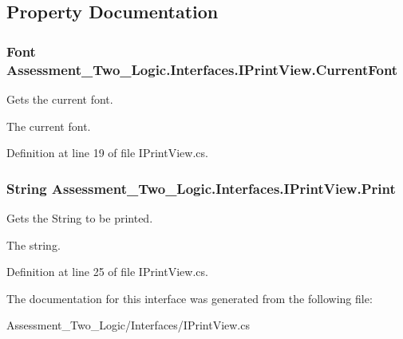 \subsection{Property Documentation}
\hypertarget{interface_assessment___two___logic_1_1_interfaces_1_1_i_print_view_a9368f6ee671be1c540a3d9240f03aed4}{
\subsubsection[{CurrentFont}]{\setlength{\rightskip}{0pt plus 5cm}Font Assessment\_\-Two\_\-Logic.Interfaces.IPrintView.CurrentFont}}
\label{interface_assessment___two___logic_1_1_interfaces_1_1_i_print_view_a9368f6ee671be1c540a3d9240f03aed4}


Gets the current font. 

The current font.

Definition at line 19 of file IPrintView.cs.

\hypertarget{interface_assessment___two___logic_1_1_interfaces_1_1_i_print_view_aae77c0c48f1acccf4fe91b8fd2cd265f}{
\subsubsection[{Print}]{\setlength{\rightskip}{0pt plus 5cm}String Assessment\_\-Two\_\-Logic.Interfaces.IPrintView.Print}}
\label{interface_assessment___two___logic_1_1_interfaces_1_1_i_print_view_aae77c0c48f1acccf4fe91b8fd2cd265f}


Gets the String to be printed. 

The string.

Definition at line 25 of file IPrintView.cs.



The documentation for this interface was generated from the following file:\begin{DoxyCompactItemize}
\item 
Assessment\_\-Two\_\-Logic/Interfaces/IPrintView.cs\end{DoxyCompactItemize}

